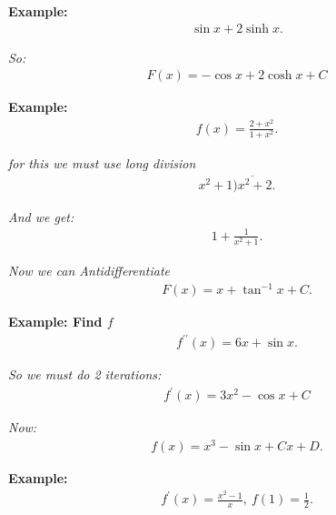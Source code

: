 \documentclass{report}
\begin{document}
  \bigbreak \noindent 
  \begin{mdframed}
    \textbf{Example: }
    \begin{align*}
      \sin{x} + 2\sinh{x}
    .\end{align*}
  \end{mdframed}
  \bigbreak \noindent
  \textit{So:}
  \begin{align*}
    F(x) = -\cos{x}+2\cosh{x} + C
  \end{align*}

  \bigbreak \noindent 
  \begin{mdframed}
    \textbf{Example: }
     \begin{align*}
       f(x) = \frac{2+x^{2}}{1+x^{2}} 
     .\end{align*} 
  \end{mdframed}

  \bigbreak \noindent 
  \textit{for this we must use long division}
  \begin{align*}
    x^{2} + 1 \overline{)x^{2}+2}
  .\end{align*}

  \bigbreak \noindent 
  \textit{And we get:}
  \begin{align*}
    1 + \frac{1}{x^{2}+1}
  .\end{align*}

  \bigbreak \noindent 
  \textit{Now we can Antidifferentiate}
  \begin{align*}
    F(x) = x + \tan^{-1}{x} + C 
  .\end{align*}

  \bigbreak \noindent 
  \begin{mdframed}
    \textbf{Example: Find $f $}
    \begin{align*}
      f^{\prime\prime}(x) = 6x+\sin{x}      
    .\end{align*}
  \end{mdframed}

  \bigbreak \noindent
  \textit{So we must do 2 iterations:}
  \begin{align*}
   f^{\prime}(x) = 3x^{2} - \cos{x} + C  
  \end{align*}

  \bigbreak \noindent 
  \textit{Now:} 
  \begin{align*}
    f(x) = x^{3} - \sin{x} + Cx + D
  .\end{align*}

  \bigbreak \noindent 
  \begin{mdframed}
    \textbf{Example: }
    \begin{align*}
      f^{\prime}(x) = \frac{x^{2}-1}{x},\ f(1)= \frac{1}{2}
    .\end{align*}
  \end{mdframed}
\end{document}
